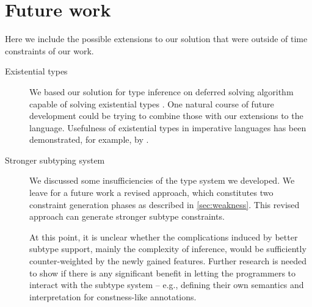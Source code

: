 

\section*{Future work}

Here we include the possible extensions to our solution that were outside of time constraints of our work.

\begin{description}
    \item[Existential types] We based our solution for type inference on deferred solving algorithm capable of solving existential types \cite{vytiniotis2011outsidein}. One natural course of future development could be trying to combine those with our extensions to the language. Usefulness of existential types in imperative languages has been demonstrated, for example, by \citet{grossman2002existential}.

    \item[Stronger subtyping system] We discussed some insufficiencies of the type system we developed. We leave for a future work a revised approach, which constitutes two constraint generation phases as described in \cref{sec:weakness}. This revised approach can generate stronger subtype constraints.

    At this point, it is unclear whether the complications induced by better subtype support, mainly the complexity of inference, would be sufficiently counter-weighted by the newly gained features. Further research is needed to show if there is any significant benefit in letting the programmers to interact with the subtype system -- e.g., defining their own semantics and interpretation for constness-like annotations.
\end{description}
